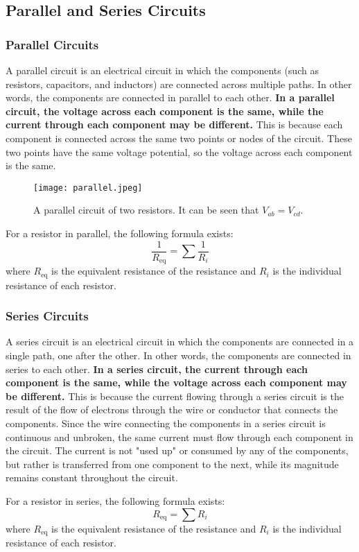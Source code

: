 \documentclass[12pt]{article}
\begin{document}
    \subsection{Parallel and Series Circuits}
    \subsubsection{Parallel Circuits}
    A parallel circuit is an electrical circuit in which the components (such as resistors, capacitors, and inductors) are connected across multiple paths. In other words, the components are connected in parallel to each other. \textbf{In a parallel circuit, the voltage across each component is the same, while the current through each component may be different.} This is because each component is connected across the same two points or nodes of the circuit. These two points have the same voltage potential, so the voltage across each component is the same.
\begin{figure}[H]
  \centering
      \texttt{[image: parallel.jpeg]}
      \caption{A parallel circuit of two resistors. It can be seen that $V_{ab} = V_{cd}$.}
  \end{figure}
    For a resistor in parallel, the following formula exists:
    \[\frac{1}{R_{\text{eq}}} = \sum \frac{1}{R_i}\]
    where $R_{\text{eq}}$ is the equivalent resistance of the resistance and $R_i$ is the individual resistance of each resistor. 
  \subsubsection{Series Circuits}
  A series circuit is an electrical circuit in which the components are connected in a single path, one after the other. In other words, the components are connected in series to each other. \textbf{In a series circuit, the current through each component is the same, while the voltage across each component may be different.} This is because the current flowing through a series circuit is the result of the flow of electrons through the wire or conductor that connects the components. Since the wire connecting the components in a series circuit is continuous and unbroken, the same current must flow through each component in the circuit. The current is not "used up" or consumed by any of the components, but rather is transferred from one component to the next, while its magnitude remains constant throughout the circuit. 

  For a resistor in series, the following formula exists:
  \[R_{\text{eq}} = \sum R_i\]
  where $R_{\text{eq}}$ is the equivalent resistance of the resistance and $R_i$ is the individual resistance of each resistor.
\end{document}
